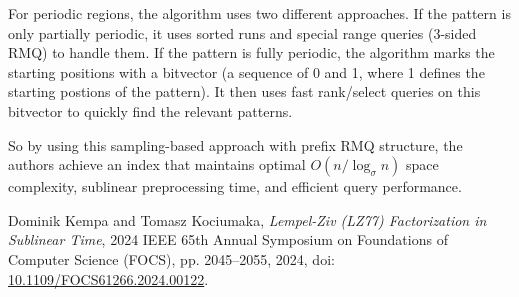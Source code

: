 For periodic regions, the algorithm uses two different approaches. If the pattern is only partially periodic, it uses sorted runs and special range queries (3-sided RMQ) to handle them. If the pattern is fully periodic, the algorithm marks the starting positions with a bitvector (a sequence of 0 and 1, where 1 defines the starting postions of the pattern). It then uses fast rank/select queries on this bitvector to quickly find the relevant patterns.

So by using this sampling-based approach with prefix RMQ structure, the authors achieve an index that maintains optimal \( O(n / \log_{\sigma} n) \) space complexity, sublinear preprocessing time, and efficient query performance.

\begin{thebibliography}{99}
  Dominik Kempa and Tomasz Kociumaka,
  \textit{Lempel-Ziv (LZ77) Factorization in Sublinear Time},
  2024 IEEE 65th Annual Symposium on Foundations of Computer Science (FOCS),
  pp. 2045--2055, 2024, doi: \href{https://doi.org/10.1109/FOCS61266.2024.00122}{10.1109/FOCS61266.2024.00122}.
\end{thebibliography}
